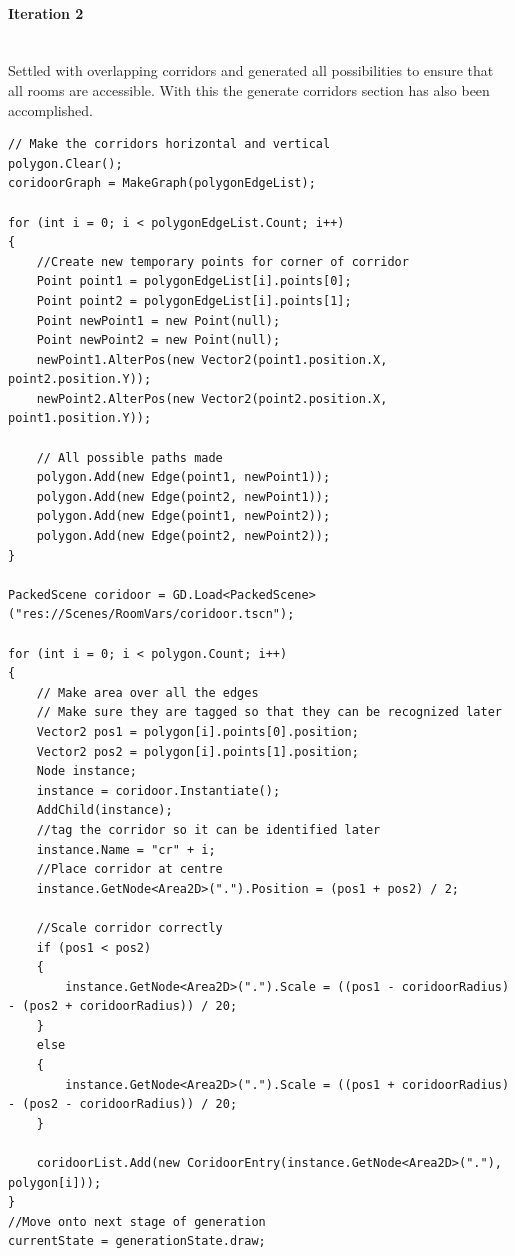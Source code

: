 \documentclass{article}
\newcommand{\myparagraph}[1]{\paragraph{#1}\mbox{}\\} %
\begin{document}
\myparagraph{Iteration 2}
Settled with overlapping corridors and generated all possibilities to ensure that all rooms are accessible. With this the generate corridors section has also been accomplished.
\begin{lstlisting}
// Make the corridors horizontal and vertical
polygon.Clear();
coridoorGraph = MakeGraph(polygonEdgeList);

for (int i = 0; i < polygonEdgeList.Count; i++)
{
    //Create new temporary points for corner of corridor
    Point point1 = polygonEdgeList[i].points[0];
    Point point2 = polygonEdgeList[i].points[1];
    Point newPoint1 = new Point(null);
    Point newPoint2 = new Point(null);
    newPoint1.AlterPos(new Vector2(point1.position.X, point2.position.Y));
    newPoint2.AlterPos(new Vector2(point2.position.X, point1.position.Y));

    // All possible paths made
    polygon.Add(new Edge(point1, newPoint1));
    polygon.Add(new Edge(point2, newPoint1));
    polygon.Add(new Edge(point1, newPoint2));
    polygon.Add(new Edge(point2, newPoint2));
}

PackedScene coridoor = GD.Load<PackedScene>("res://Scenes/RoomVars/coridoor.tscn");

for (int i = 0; i < polygon.Count; i++)
{
    // Make area over all the edges
    // Make sure they are tagged so that they can be recognized later
    Vector2 pos1 = polygon[i].points[0].position;
    Vector2 pos2 = polygon[i].points[1].position;
    Node instance;
    instance = coridoor.Instantiate();
    AddChild(instance);
    //tag the corridor so it can be identified later
    instance.Name = "cr" + i;
    //Place corridor at centre 
    instance.GetNode<Area2D>(".").Position = (pos1 + pos2) / 2;

	//Scale corridor correctly
    if (pos1 < pos2)
    {
        instance.GetNode<Area2D>(".").Scale = ((pos1 - coridoorRadius) - (pos2 + coridoorRadius)) / 20;
    }
    else
    {
        instance.GetNode<Area2D>(".").Scale = ((pos1 + coridoorRadius) - (pos2 - coridoorRadius)) / 20;
    }

    coridoorList.Add(new CoridoorEntry(instance.GetNode<Area2D>("."), polygon[i]));
}
//Move onto next stage of generation
currentState = generationState.draw;
\end{lstlisting}
\end{document}
